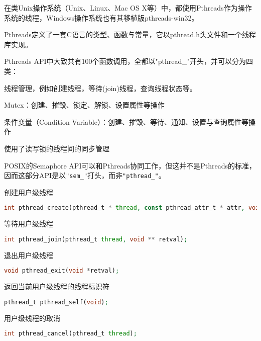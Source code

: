 在类Unix操作系统（Unix、Linux、Mac OS X等）中，都使用Pthreads作为操作系统的线程，Windows操作系统也有其移植版pthreads-win32。

Pthreads定义了一套C语言的类型、函数与常量，它以pthread.h头文件和一个线程库实现。

Pthreads API中大致共有100个函数调用，全都以"pthread\_"开头，并可以分为四类：

\begin{compactitem}
\item 线程管理，例如创建线程，等待(join)线程，查询线程状态等。
\item Mutex：创建、摧毁、锁定、解锁、设置属性等操作
\item 条件变量（Condition Variable）：创建、摧毁、等待、通知、设置与查询属性等操作
\item 使用了读写锁的线程间的同步管理
\end{compactitem}

POSIX的Semaphore API可以和Pthreads协同工作，但这并不是Pthreads的标准，因而这部分API是以\texttt{"sem\_"}打头，而非\texttt{"pthread\_"}。



\begin{compactitem}
\item 创建用户级线程

\begin{lstlisting}[language=PHP]
int pthread_create(pthread_t * thread, const pthread_attr_t * attr, void *(*start_routine)(void *), void *arg);
\end{lstlisting}

\item 等待用户级线程

\begin{lstlisting}[language=PHP]
int pthread_join(pthread_t thread, void ** retval);
\end{lstlisting}

\item 退出用户级线程

\begin{lstlisting}[language=PHP]
void pthread_exit(void *retval);
\end{lstlisting}

\item 返回当前用户级线程的线程标识符

\begin{lstlisting}[language=PHP]
pthread_t pthread_self(void);
\end{lstlisting}

\item 用户级线程的取消

\begin{lstlisting}[language=PHP]
int pthread_cancel(pthread_t thread);
\end{lstlisting}

\end{compactitem}



